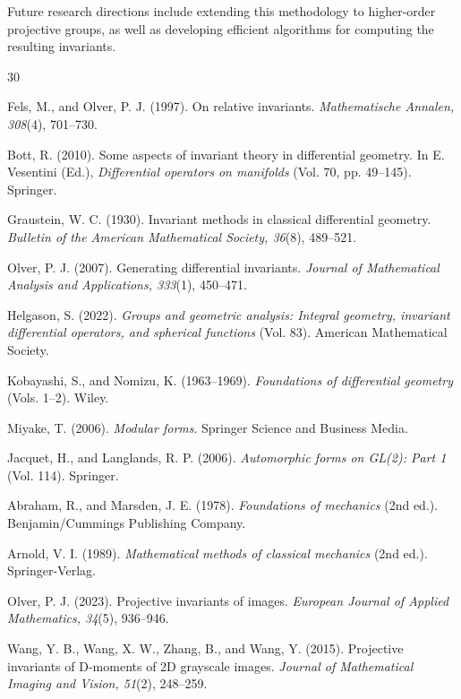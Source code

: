 \documentclass[12pt,reqno]{amsart}
\begin{document}
Future research directions include extending this methodology to higher-order projective groups, as well as developing efficient algorithms for computing the resulting invariants.

\begin{thebibliography}{30}

Fels, M., and Olver, P. J. (1997). On relative invariants. \textit{Mathematische Annalen, 308}(4), 701--730.

Bott, R. (2010). Some aspects of invariant theory in differential geometry. In E. Vesentini (Ed.), \textit{Differential operators on manifolds} (Vol. 70, pp. 49--145). Springer.

Graustein, W. C. (1930). Invariant methods in classical differential geometry. \textit{Bulletin of the American Mathematical Society, 36}(8), 489--521.

Olver, P. J. (2007). Generating differential invariants. \textit{Journal of Mathematical Analysis and Applications, 333}(1), 450--471.

Helgason, S. (2022). \textit{Groups and geometric analysis: Integral geometry, invariant differential operators, and spherical functions} (Vol. 83). American Mathematical Society.

Kobayashi, S., and Nomizu, K. (1963--1969). \textit{Foundations of differential geometry} (Vols. 1--2). Wiley.

Miyake, T. (2006). \textit{Modular forms}. Springer Science and Business Media.

Jacquet, H., and Langlands, R. P. (2006). \textit{Automorphic forms on GL(2): Part 1} (Vol. 114). Springer.

Abraham, R., and Marsden, J. E. (1978). \textit{Foundations of mechanics} (2nd ed.). Benjamin/Cummings Publishing Company.

Arnold, V. I. (1989). \textit{Mathematical methods of classical mechanics} (2nd ed.). Springer-Verlag.

Olver, P. J. (2023). Projective invariants of images. \textit{European Journal of Applied Mathematics, 34}(5), 936--946.

Wang, Y. B., Wang, X. W., Zhang, B., and Wang, Y. (2015). Projective invariants of D-moments of 2D grayscale images. \textit{Journal of Mathematical Imaging and Vision, 51}(2), 248--259.


\end{thebibliography}
\end{document}
